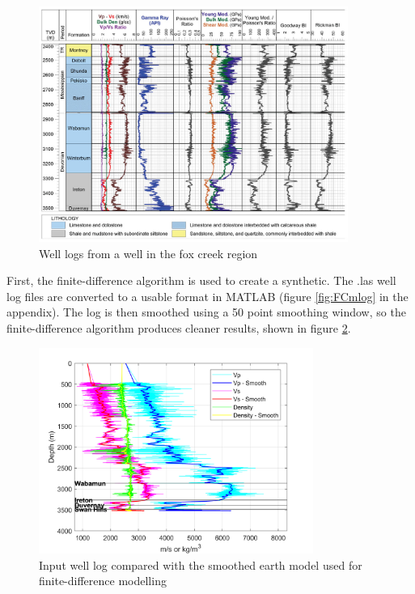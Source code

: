 \documentclass[12pt]{article}
\begin{document}
\begin{figure}[!htb]
	\centering
	\includegraphics[width=0.9\textwidth]{Figures/duvernayLogs.jpg}
	\caption[Fox Creek well logs]{Well logs from a well in the fox creek region \citep{german2018}}
	\label{fig:FCLogs}
\end{figure}

	First, the finite-difference algorithm is used to create a synthetic. The .las well log files are converted to a usable format in MATLAB (figure \ref{fig:FCmlog} in the appendix). The log is then smoothed using a 50 point smoothing window, so the finite-difference algorithm produces cleaner results, shown in figure \ref{fig:FDClog}. 

\begin{figure}[!htb]
	\centering
	\includegraphics[width=0.8\textwidth]{Figures/FDCsmoothLog.png}
	\caption[Fox Creek finite-difference earth model]{Input well log compared with the smoothed earth model used for finite-difference modelling}
	\label{fig:FDClog}
\end{figure}
\end{document}
